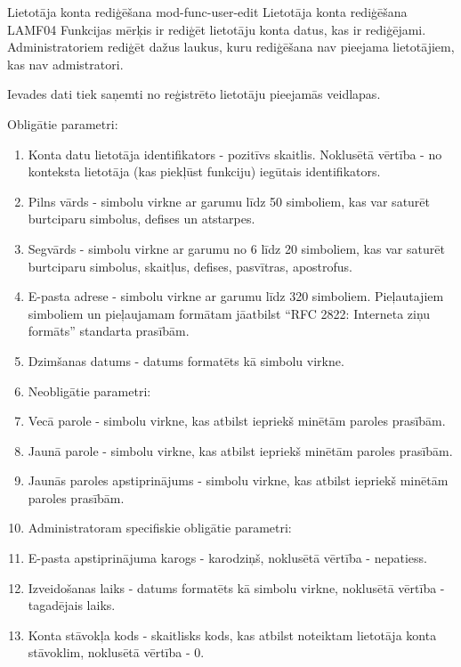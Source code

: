 \moduleFunctionTable
{Lietotāja konta rediģēšana}
{mod-func-user-edit}
{Lietotāja konta rediģēšana}
{LAMF04}
{
	Funkcijas mērķis ir rediģēt lietotāju konta datus, kas ir rediģējami.
	Administratoriem rediģēt dažus laukus, kuru rediģēšana nav pieejama lietotājiem, kas nav admistratori.
}
{
	Ievades dati tiek saņemti no reģistrēto lietotāju pieejamās veidlapas.

	Obligātie parametri:
	\begin{enumerate}
		\item Konta datu lietotāja identifikators - pozitīvs skaitlis.
		      Noklusētā vērtība - no konteksta lietotāja (kas piekļūst funkciju) iegūtais identifikators.
		\item Pilns vārds - simbolu virkne ar garumu līdz 50 simboliem, kas var saturēt burtciparu simbolus, defises un atstarpes.
		\item Segvārds - simbolu virkne ar garumu no 6 līdz 20 simboliem, kas var saturēt burtciparu simbolus, skaitļus, defises, pasvītras, apostrofus.
		\item E-pasta adrese - simbolu virkne ar garumu līdz 320 simboliem.
		      Pieļautajiem simboliem un pieļaujamam formātam jāatbilst ``RFC 2822: Interneta ziņu formāts'' standarta prasībām.
		\item Dzimšanas datums - datums formatēts kā simbolu virkne.
		\item Neobligātie parametri:
		\item Vecā parole - simbolu virkne, kas atbilst iepriekš minētām paroles prasībām.
		\item Jaunā parole - simbolu virkne, kas atbilst iepriekš minētām paroles prasībām.
		\item Jaunās paroles apstiprinājums - simbolu virkne, kas atbilst iepriekš minētām paroles prasībām.
		\item Administratoram specifiskie obligātie parametri:
		\item E-pasta apstiprinājuma karogs - karodziņš, noklusētā vērtība - nepatiess.
		\item Izveidošanas laiks - datums formatēts kā simbolu virkne, noklusētā vērtība - tagadējais laiks.
		\item Konta stāvokļa kods - skaitlisks kods, kas atbilst noteiktam lietotāja konta stāvoklim, noklusētā vērtība - 0.
	\end{enumerate}
}
